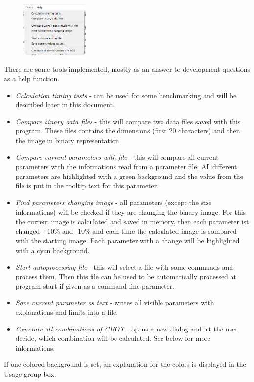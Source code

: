 \documentclass[11pt]{article} %
\begin{document}
\begin{figure}
  \begin{center}
    \includegraphics[width=0.30\textwidth]{menu-tools.png}
  \end{center}
\end{figure}
There are some tools implemented, mostly as an answer to development questions as a help function.
\begin{itemize}\itemsep0pt
\item {\it Calculation timing tests} - can be used for some benchmarking and will be described later in this document.
\item {\it Compare binary data files} - this will compare two data files saved with this program. These files contains the dimensions (first 20 characters) and then the image in binary representation.
\item {\it Compare current parameters with file} - this will compare all current parameters with the informations read from a parameter file. All different parameters are highlighted with a green background and the value from the file is put in the tooltip text for this parameter.
\item {\it Find parameters changing image} - all parameters (except the size informations) will be checked if they are changing the binary image. For this the current image is calculated and saved in memory, then each parameter ist changed +10\% and -10\% and each time the calculated image is compared with the starting image. Each parameter with a change will be highlighted with a cyan background.
\item {\it Start autoprocessing file} - this will select a file with some commands and process them. Then this file can be used to be automatically processed at program start if given as a command line parameter.
\item {\it Save current parameter as text} - writes all visible parameters with explanations and limits into a file.
\item {\it Generate all combinations of CBOX} - opens a new dialog and let the user decide, which combination will be calculated. See below for more informations.
\end{itemize}
If one colored background is set, an explanation for the colors is displayed in the Usage group box.
\end{document}
